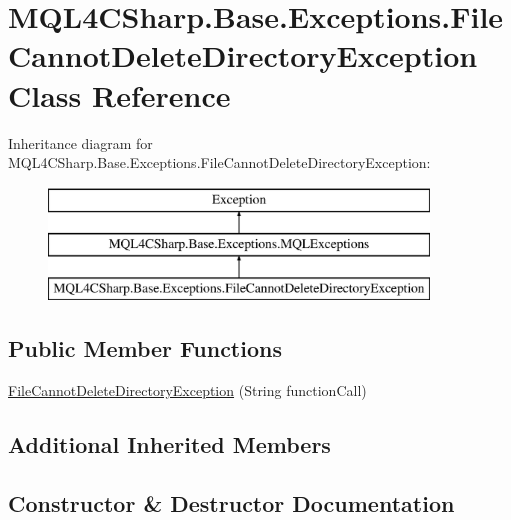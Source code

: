 \hypertarget{class_m_q_l4_c_sharp_1_1_base_1_1_exceptions_1_1_file_cannot_delete_directory_exception}{}\section{M\+Q\+L4\+C\+Sharp.\+Base.\+Exceptions.\+File\+Cannot\+Delete\+Directory\+Exception Class Reference}
\label{class_m_q_l4_c_sharp_1_1_base_1_1_exceptions_1_1_file_cannot_delete_directory_exception}
Inheritance diagram for M\+Q\+L4\+C\+Sharp.\+Base.\+Exceptions.\+File\+Cannot\+Delete\+Directory\+Exception\+:\begin{figure}[H]
\begin{center}
\leavevmode
\includegraphics[height=3.000000cm]{class_m_q_l4_c_sharp_1_1_base_1_1_exceptions_1_1_file_cannot_delete_directory_exception}
\end{center}
\end{figure}
\subsection*{Public Member Functions}
\begin{DoxyCompactItemize}
\item 
\hyperlink{class_m_q_l4_c_sharp_1_1_base_1_1_exceptions_1_1_file_cannot_delete_directory_exception_ac3db455f4b74e52ece5e0bb88403d37a}{File\+Cannot\+Delete\+Directory\+Exception} (String function\+Call)
\end{DoxyCompactItemize}
\subsection*{Additional Inherited Members}


\subsection{Constructor \& Destructor Documentation}
